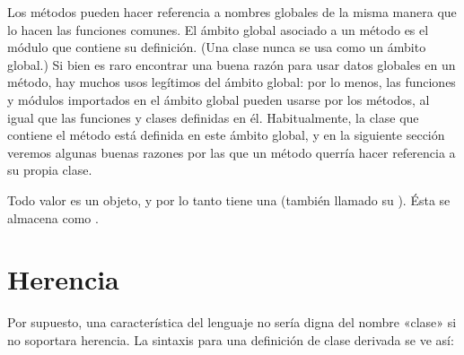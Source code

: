 \documentclass[a5paper,10pt,spanish]{sphinxmanual}
\begin{document}
\begin{sphinxVerbatim}[commandchars=\\\{\}]
 
     
          \PYG{p}{[}\PYG{p}{]}

      

      
\end{sphinxVerbatim}

\sphinxAtStartPar
Los métodos pueden hacer referencia a nombres globales de la misma manera que lo hacen las funciones comunes.  El ámbito global asociado a un método es el módulo que contiene su definición.  (Una clase nunca se usa como un ámbito global.)  Si bien es raro encontrar una buena razón para usar datos globales en un método, hay muchos usos legítimos del ámbito global: por lo menos, las funciones y módulos importados en el ámbito global pueden usarse por los métodos, al igual que las funciones y clases definidas en él. Habitualmente, la clase que contiene el método está definida en este ámbito global, y en la siguiente sección veremos algunas buenas razones por las que un método querría hacer referencia a su propia clase.

\sphinxAtStartPar
Todo valor es un objeto, y por lo tanto tiene una  (también llamado su ). Ésta se almacena como .


\section{Herencia}
\label{\detokenize{tutorial/classes:inheritance}}\label{\detokenize{tutorial/classes:tut-inheritance}}
\sphinxAtStartPar
Por supuesto, una característica del lenguaje no sería digna del nombre «clase» si no soportara herencia.  La sintaxis para una definición de clase derivada se ve así:

\begin{sphinxVerbatim}[commandchars=\\\{\}]
 
\end{sphinxVerbatim}
\end{document}
